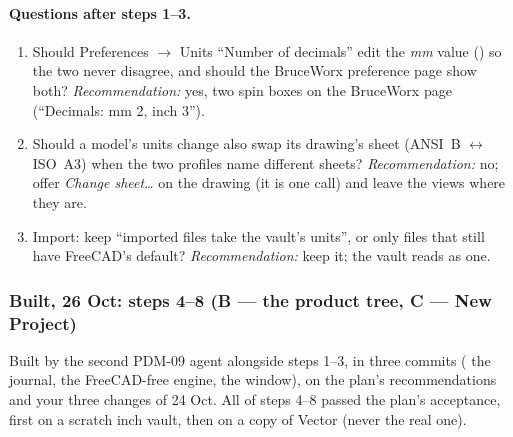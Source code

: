 \paragraph{Questions after steps 1--3.}
\begin{enumerate}[nosep]
  \item Should Preferences $\rightarrow$ Units ``Number of decimals'' edit the \emph{mm} value
        () so the two never disagree, and should the BruceWorx preference page show
        both? \emph{Recommendation:} yes, two spin boxes on the BruceWorx page (``Decimals: mm 2, inch 3'').
  \item Should a model's units change also swap its drawing's sheet (ANSI~B $\leftrightarrow$ ISO~A3) when
        the two profiles name different sheets? \emph{Recommendation:} no; offer \emph{Change sheet\ldots} on
        the drawing (it is one call) and leave the views where they are.
  \item Import: keep ``imported files take the vault's units'', or only files that still have FreeCAD's
        default? \emph{Recommendation:} keep it; the vault reads as one.
\end{enumerate}

\subsubsection*{Built, 26 Oct: steps 4--8 (B --- the product tree, C --- New Project)}

Built by the second PDM-09 agent alongside steps 1--3, in three commits ( the journal,
 the FreeCAD-free engine,  the window), on the plan's recommendations and your three
changes of 24 Oct. All of steps 4--8 passed the plan's acceptance, first on a scratch inch vault, then on a copy of
Vector (never the real one).

